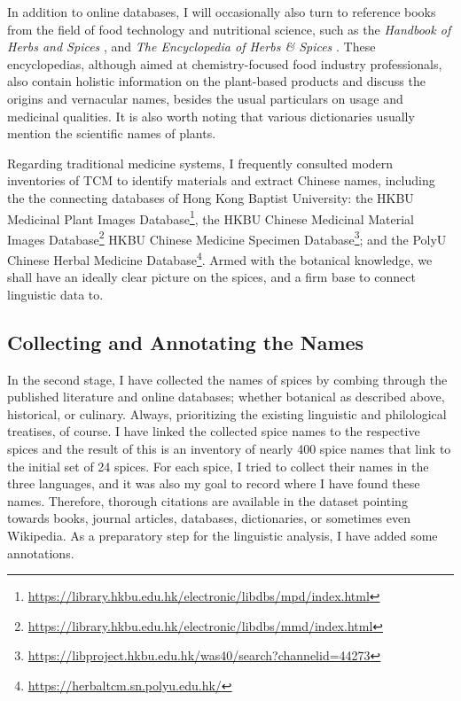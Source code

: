 In addition to online databases, I will occasionally also turn to reference books from the field of food technology and nutritional science, such as the \textit{Handbook of Herbs and Spices} \autocite{peter_handbook_2012,peter_handbook_2006}, and \textit{The Encyclopedia of Herbs \& Spices} \autocite{ravindran_encyclopedia_2017}. These encyclopedias, although aimed at chemistry-focused food industry professionals, also contain holistic information on the plant-based products and discuss the origins and vernacular names, besides the usual particulars on usage and medicinal qualities. It is also worth noting that various dictionaries usually mention the scientific names of plants.

Regarding traditional medicine systems, I frequently consulted modern inventories of \gls{TCM} to identify materials and extract Chinese names, including the the connecting databases of Hong Kong Baptist University: the HKBU Medicinal Plant Images Database\footnote{\url{https://library.hkbu.edu.hk/electronic/libdbs/mpd/index.html}}, the HKBU Chinese Medicinal Material Images Database\footnote{\url{https://library.hkbu.edu.hk/electronic/libdbs/mmd/index.html}} HKBU Chinese Medicine Specimen Database\footnote{\url{https://libproject.hkbu.edu.hk/was40/search?channelid=44273}}; and the PolyU Chinese Herbal Medicine Database\footnote{\url{https://herbaltcm.sn.polyu.edu.hk/}}. Armed with the botanical knowledge, we shall have an ideally clear picture on the spices, and a firm base to connect linguistic data to.


\subsection{Collecting and Annotating the Names}

In the second stage, I have collected the names of spices by combing through the published literature and online databases; whether botanical as described above, historical, or culinary. Always, prioritizing the existing linguistic and philological treatises, of course. I have linked the collected spice names to the respective spices and the result of this is an inventory of nearly 400 spice names that link to the initial set of 24 spices. For each spice, I tried to collect their names in the three languages, and it was also my goal to record where I have found these names. Therefore, thorough citations are available in the dataset pointing towards books, journal articles, databases, dictionaries, or sometimes even Wikipedia. As a preparatory step for the linguistic analysis, I have added some annotations. 

